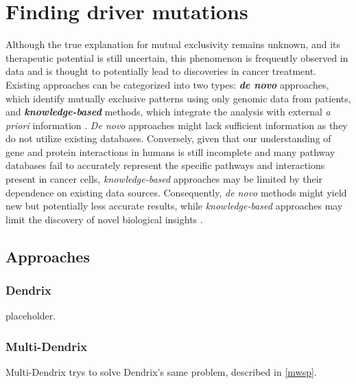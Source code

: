 \chapter{Finding driver mutations} \label{chap:finding_driver_mutations}

Although the true explanation for mutual exclusivity remains unknown, and its therapeutic potential is still uncertain, this phenomenon is frequently observed in data and is thought to potentially lead to discoveries in cancer treatment. Existing approaches can be categorized into two types: \textbf{\textit{de novo}} approaches, which identify mutually exclusive patterns using only genomic data from patients, and \textbf{\textit{knowledge-based}} methods, which integrate the analysis with external \textit{a priori} information \cite{survey}. \textit{De novo} approaches might lack sufficient information as they do not utilize existing databases. Conversely, given that our understanding of gene and protein interactions in humans is still incomplete and many pathway databases fail to accurately represent the specific pathways and interactions present in cancer cells, \textit{knowledge-based} approaches may be limited by their dependence on existing data sources. Consequently, \textit{de novo} methods might yield new but potentially less accurate results, while \textit{knowledge-based} approaches may limit the discovery of novel biological insights \cite{multi-dendrix}.

\section{Approaches}

\subsection{Dendrix}

placeholder. 

\subsection{Multi-Dendrix}

Multi-Dendrix trys to solve Dendrix's same problem, described in \cref{mwsp}. 

